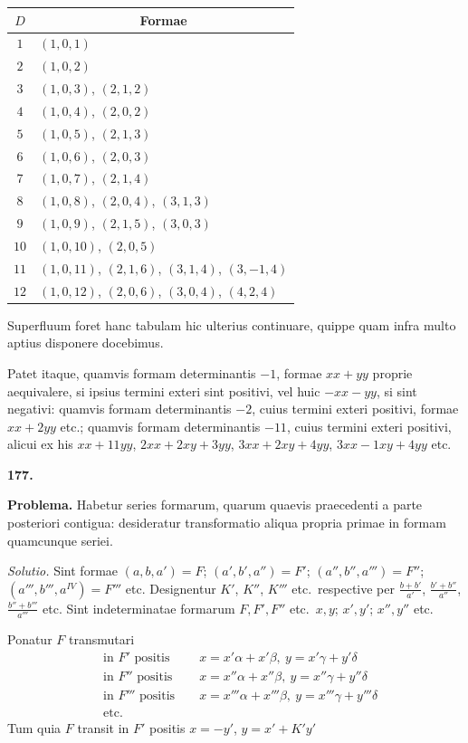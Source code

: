 \documentclass[12pt,a4paper]{article}
\theoremstyle{plain}
\theoremstyle{definition}
\theoremstyle{remark}
\begin{document}
\begin{center}
\begin{tabular}{cl}
\toprule
$D$ & \multicolumn{1}{c}{Formae} \\
\midrule
$1$ & $(1,0,1)$ \\
$2$ & $(1,0,2)$ \\
$3$ & $(1,0,3)$, $(2,1,2)$ \\
$4$ & $(1,0,4)$, $(2,0,2)$ \\
$5$ & $(1,0,5)$, $(2,1,3)$ \\
$6$ & $(1,0,6)$, $(2,0,3)$ \\
$7$ & $(1,0,7)$, $(2,1,4)$ \\
$8$ & $(1,0,8)$, $(2,0,4)$, $(3,1,3)$ \\
$9$ & $(1,0,9)$, $(2,1,5)$, $(3,0,3)$ \\
$10$ & $(1,0,10)$, $(2,0,5)$ \\
$11$ & $(1,0,11)$, $(2,1,6)$, $(3,1,4)$, $(3,-1,4)$ \\
$12$ & $(1,0,12)$, $(2,0,6)$, $(3,0,4)$, $(4,2,4)$ \\
\bottomrule
\end{tabular}
\end{center}

Superfluum foret hanc tabulam hic ulterius continuare, quippe quam infra multo aptius disponere docebimus.

Patet itaque, quamvis formam determinantis $-1$, formae $xx+yy$ proprie aequivalere, si ipsius termini exteri sint positivi, vel huic $-xx-yy$, si sint negativi: quamvis formam determinantis $-2$, cuius termini exteri positivi, formae $xx+2yy$ etc.; quamvis formam determinantis $-11$, cuius termini exteri positivi, alicui ex his $xx+11yy$, $2xx+2xy+3yy$, $3xx+2xy+4yy$, $3xx-1xy+4yy$ etc.

\textbf{177.}

\textbf{Problema.} Habetur series formarum, quarum quaevis praecedenti a parte posteriori contigua: desideratur transformatio aliqua propria primae in formam quamcunque seriei.

\textit{Solutio.} Sint formae $(a,b,a')=F$; $(a',b',a'')=F'$; $(a'',b'',a''')=F''$; $(a''',b''',a^{IV})=F'''$ etc. Designentur $K'$, $K''$, $K'''$ etc.\ respective per $\frac{b+b'}{a'}$, $\frac{b'+b''}{a''}$, $\frac{b''+b'''}{a'''}$ etc. Sint indeterminatae formarum $F,F',F''$ etc.\ $x,y$; $x',y'$; $x'',y''$ etc.

Ponatur $F$ transmutari
\begin{align*}
&\text{in }F'\text{ positis }&&x=x'\alpha+x'\beta,\ y=x'\gamma+y'\delta\\
&\text{in }F''\text{ positis }&&x=x''\alpha+x''\beta,\ y=x''\gamma+y''\delta\\
&\text{in }F'''\text{ positis }&&x=x'''\alpha+x'''\beta,\ y=x'''\gamma+y'''\delta\\
&\text{etc.}\end{align*}
Tum quia $F$ transit in $F'$ positis $x=-y'$, $y=x'+K'y'$
\end{document}
